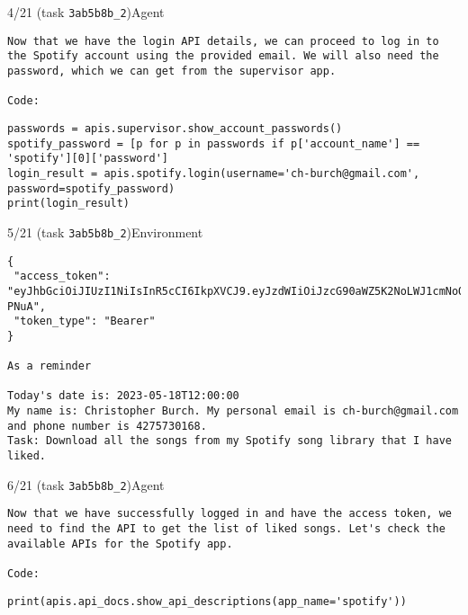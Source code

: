 \begin{minipage}{0.95\linewidth}
\begin{assistant_message_box}{{4/21 (task \texttt{3ab5b8b\_2})\hfill Agent}}
\scriptsize
\begin{Verbatim}[breaklines]
Now that we have the login API details, we can proceed to log in to the Spotify account using the provided email. We will also need the password, which we can get from the supervisor app.

Code:
\end{Verbatim}
\begin{tcolorbox}[colback=codebgcolor,boxrule=0pt]\begin{Verbatim}[breaklines]
passwords = apis.supervisor.show_account_passwords()
spotify_password = [p for p in passwords if p['account_name'] == 'spotify'][0]['password']
login_result = apis.spotify.login(username='ch-burch@gmail.com', password=spotify_password)
print(login_result)
\end{Verbatim}
\end{tcolorbox}\end{assistant_message_box}
\end{minipage}

\hspace*{8mm}%
\begin{minipage}{0.95\linewidth}
\begin{user_message_box}{{5/21 (task \texttt{3ab5b8b\_2})\hfill Environment}}
\scriptsize
\begin{Verbatim}[breaklines]
{
 "access_token": "eyJhbGciOiJIUzI1NiIsInR5cCI6IkpXVCJ9.eyJzdWIiOiJzcG90aWZ5K2NoLWJ1cmNoQGdtYWlsLmNvbSIsImV4cCI6MTY4NDQxMjA5OH0.p4jMC84at7BtJtgi1dsGHKvyyfmOxF6DXtNAs6-PNuA",
 "token_type": "Bearer"
}

As a reminder

Today's date is: 2023-05-18T12:00:00
My name is: Christopher Burch. My personal email is ch-burch@gmail.com and phone number is 4275730168.
Task: Download all the songs from my Spotify song library that I have liked.
\end{Verbatim}
\end{user_message_box}
\end{minipage}

\begin{minipage}{0.95\linewidth}
\begin{assistant_message_box}{{6/21 (task \texttt{3ab5b8b\_2})\hfill Agent}}
\scriptsize
\begin{Verbatim}[breaklines]
Now that we have successfully logged in and have the access token, we need to find the API to get the list of liked songs. Let's check the available APIs for the Spotify app.

Code:
\end{Verbatim}
\begin{tcolorbox}[colback=codebgcolor,boxrule=0pt]\begin{Verbatim}[breaklines]
print(apis.api_docs.show_api_descriptions(app_name='spotify'))
\end{Verbatim}
\end{tcolorbox}\end{assistant_message_box}
\end{minipage}

